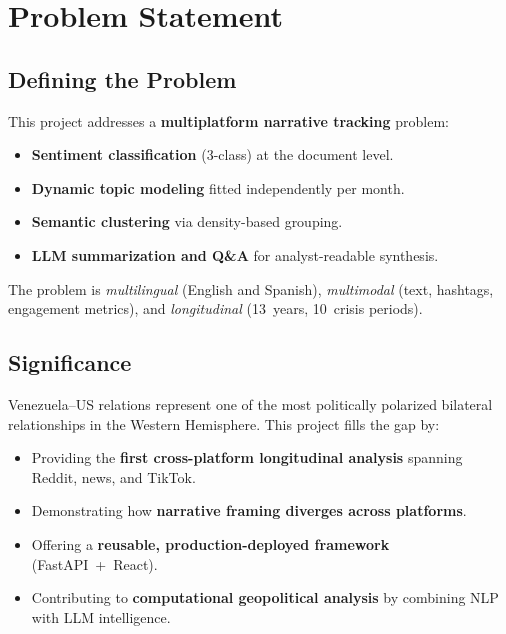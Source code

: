 \documentclass[12pt, a4paper]{article}
\begin{document}
\section{Problem Statement}
\label{sec:problem}

\subsection{Defining the Problem}

This project addresses a \textbf{multiplatform narrative tracking} problem:
\begin{itemize}[leftmargin=*]
  \item \textbf{Sentiment classification} (3-class) at the document level.
  \item \textbf{Dynamic topic modeling} fitted independently per month.
  \item \textbf{Semantic clustering} via density-based grouping.
  \item \textbf{LLM summarization and Q\&A} for analyst-readable synthesis.
\end{itemize}

The problem is \emph{multilingual} (English and Spanish), \emph{multimodal} (text, hashtags, engagement metrics), and \emph{longitudinal} (13~years, 10~crisis periods).

\subsection{Significance}

Venezuela--US relations represent one of the most politically polarized bilateral relationships in the Western Hemisphere. This project fills the gap by:
\begin{itemize}[leftmargin=*]
  \item Providing the \textbf{first cross-platform longitudinal analysis} spanning Reddit, news, and TikTok.
  \item Demonstrating how \textbf{narrative framing diverges across platforms}.
  \item Offering a \textbf{reusable, production-deployed framework} (FastAPI~+~React).
  \item Contributing to \textbf{computational geopolitical analysis} by combining NLP with LLM intelligence.
\end{itemize}
\end{document}
